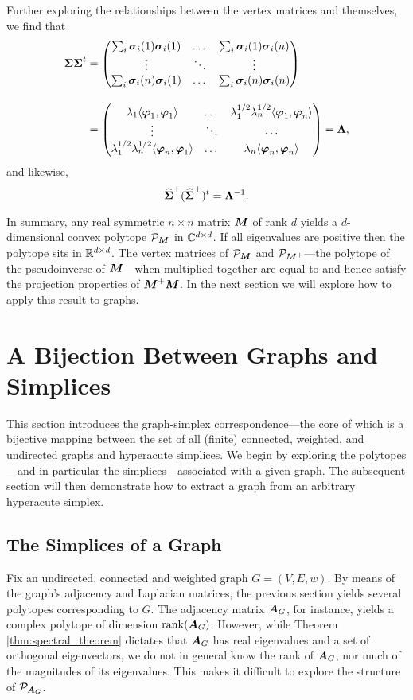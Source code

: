 Further exploring the relationships between the vertex matrices and themselves, we find that 
\begin{align}
\boldsymbol{\Sigma}\boldsymbol{\Sigma}^t &= 
\begin{pmatrix}
\sum_i \vb*{\sigma}_i(1)\vb*{\sigma}_i(1) & \dots & \sum_i \vb*{\sigma}_i(1)\vb*{\sigma}_i(n) \\
\vdots &\ddots  & \vdots \\
\sum_i \vb*{\sigma}_i(n)\vb*{\sigma}_i(1) & \dots & \sum_i \vb*{\sigma}_i(n)\vb*{\sigma}_i(n)
\end{pmatrix}\notag 
\\[10pt] 
&= 
\begin{pmatrix}
\lambda_1 \langle \vb*{\varphi}_1,\vb*{\varphi}_1\rangle & \dots & \lambda_1^{1/2}\lambda_n^{1/2}\langle \vb*{\varphi}_1,\vb*{\varphi}_n\rangle \\
\vdots & \ddots & \cdots \\
\lambda_1^{1/2}\lambda_n^{1/2}\langle \vb*{\varphi}_n,\vb*{\varphi}_1\rangle & \dots &\lambda_n \langle \vb*{\varphi}_n,\vb*{\varphi}_n\rangle 
\end{pmatrix} = \vb{\Lambda},\label{eq:SvSv^t}
\end{align}
and likewise, 
\begin{equation}
\label{eq:SvSv+}
\widehat{\boldsymbol{\Sigma}}^+(\widehat{\boldsymbol{\Sigma}}^+)^t = \vb{\Lambda}^{-1}.
\end{equation}

In summary, any real symmetric $n\times n$ matrix ${\vb*{M}}$ of rank $d$ yields a $d$-dimensional convex polytope $\mathcal{P}_{\vb*{M}}$ in $\mathbb{C}^{d\times d}$. If all eigenvalues are positive then the polytope sits in $\mathbb{R}^{d\times d}$. The vertex matrices of $\mathcal{P}_{\vb*{M}}$ and $\mathcal{P}_{{\vb*{M}}^+}$---the polytope of the pseudoinverse of ${\vb*{M}}$---when multiplied together are equal to and hence satisfy the projection properties of ${\vb*{M}}^+{\vb*{M}}$. In the next section we will explore how to apply this result to graphs. 


\section{A Bijection Between Graphs and Simplices}
\label{sec:bijection_graphs_simplices}
This section introduces the graph-simplex correspondence---the core of which is a bijective mapping between the set of all (finite) connected, weighted, and undirected graphs and hyperacute simplices. 
We begin by exploring the polytopes---and in particular the simplices---associated with a given graph. The subsequent section will then demonstrate how to extract a graph from an arbitrary hyperacute simplex. 

\subsection{The Simplices of a Graph}
\label{sec:graph_to_simplex}
Fix an undirected, connected and weighted graph $G=(V,E,w)$. By means of the graph's adjacency and Laplacian matrices, the previous section yields several polytopes corresponding to $G$. 
The adjacency matrix $\vb*{A}_G$, for instance, yields a complex polytope of dimension $\rank(\vb*{A}_G)$. However, while Theorem \ref{thm:spectral_theorem} dictates that $\vb*{A}_G$ has real eigenvalues and a set of orthogonal eigenvectors, we do not in general know the rank of $\vb*{A}_G$, nor much of the magnitudes of its eigenvalues. This makes it difficult to explore the structure of $\mathcal{P}_{\vb*{A}_G}$. 


